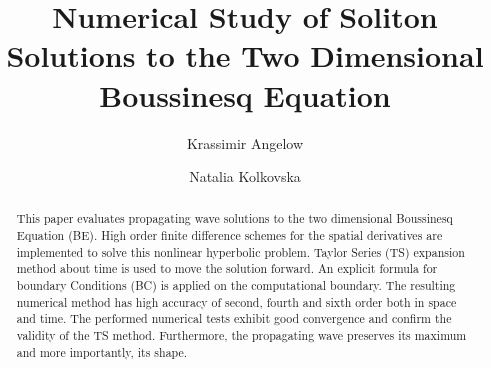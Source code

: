 \documentclass[11pt,a4paper,twoside]{article}
\begin{document}

\title{Numerical Study of Soliton Solutions to the Two Dimensional Boussinesq  Equation}




\author{Krassimir Angelow}
\address{Bulgarian Academy of Sciences, Institute of Mathematics and Informatics, ul. Acad. G. Bonchev, block 8, 1113 Sofia, Bulgaria}

\author{Natalia Kolkovska}
\address{Bulgarian Academy of Sciences, Institute of Mathematics and Informatics, ul. Acad. G. Bonchev, block 8, 1113 Sofia, Bulgaria}



\BeginPaper %


\newcommand{\ep}{\varepsilon}
\newcommand{\eps}[1]{{#1}_{\varepsilon}}
\newcommand{\rf}[1]{(\ref{#1})}
\newcommand{\RR}{\mathbb{R}}



\begin{abstract}
This paper evaluates propagating wave solutions to the two dimensional Boussinesq Equation (BE). High order finite difference schemes for the spatial derivatives are implemented to solve this nonlinear hyperbolic problem. Taylor Series (TS) expansion method about time is used to move the solution forward. An explicit formula for boundary Conditions (BC) is applied on the computational boundary. The resulting numerical method has high accuracy of second, fourth and sixth order both in space and time. The performed numerical tests exhibit good convergence and confirm the validity of the TS method. Furthermore, the propagating wave preserves its maximum and more importantly, its shape.


\end{abstract}
\end{document}
